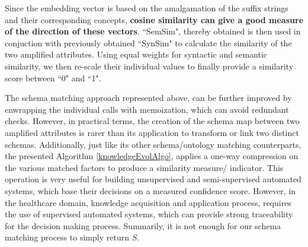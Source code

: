 Since the embedding vector is based on the amalgamation of the suffix strings and their corresponding concepts, \textbf{cosine similarity can give a good measure of the direction of these vectors}. ``SemSim", thereby obtained is then used in conjuction with previously obtained ``SynSim" to calculate the similarity of the two amplified attributes. Using equal weights for syntactic and semantic similarity, we then re-scale their individual values to finally provide a similarity score between ``0" and ``1". 

The schema matching approach represented above, can be further improved by enwrapping the individual calls with memoization, which can avoid redundant checks. However, in practical terms, the creation of the schema map between two amplified attributes is rarer than its application to transform or link two distinct schemas. Additionally, just like its other schema/ontology matching counterparts, the presented Algorithm \ref{knowledgeEvolAlgo}, applies a one-way compression on the various matched factors to produce a similarity measure/ indicator. This operation is very useful for building unsupervised and semi-supervised automated systems, which base their decisions on a measured confidence score. However, in the healthcare domain, knowledge acquisition and application process, requires the use of supervised automated systems, which can provide strong traceability for the decision making process. Summarily, it is not enough for our schema matching process to simply return $S$.

